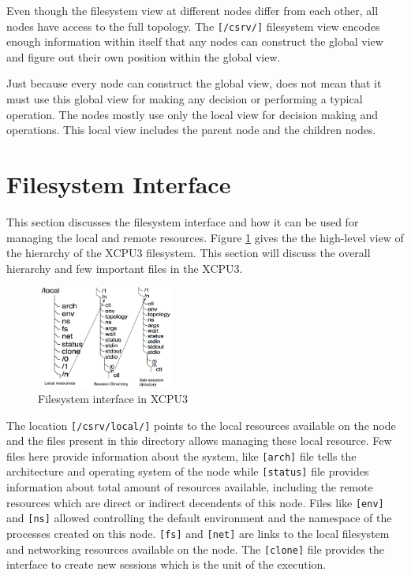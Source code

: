 \documentclass[conference]{IEEEtran}
\begin{document}
Even though the filesystem view at different nodes differ from each other, 
all nodes have access to the full topology.  The \texttt{[/csrv/]} filesystem
view encodes enough information within itself that any nodes can construct the
global view and figure out their own position within the global view.

Just because every node can construct the global view, does not mean that it
must use this global view for making any decision or performing a typical
operation. The nodes mostly use only the local view for decision making and
operations. This local view includes the parent node and the children nodes.


\section{Filesystem Interface}

This section discusses the filesystem interface and how it can be used for
managing the local and remote resources. Figure \ref{fig:xcpu3Local} gives the
the high-level view of the hierarchy of the XCPU3 filesystem.  This section
will discuss the overall hierarchy and few important files in the XCPU3.

\begin{figure}[h]
  \begin{center}
    \leavevmode
      \includegraphics[height=0.25\textheight,width=0.4\textwidth]
		{./img/local_session_subsessions}
    \caption{Filesystem interface in XCPU3}
    \label{fig:xcpu3Local}
  \end{center}
\end{figure}

The location \texttt{[/csrv/local/]} points to the local resources available on
the node and the files present in this directory allows managing these local
resource. Few files here provide information about the system, like
\texttt{[arch]} file tells the architecture and operating system of the node
while \texttt{[status]} file provides information about total amount of
resources available, including the remote resources which are direct or
indirect decendents of this node.  Files like \texttt{[env]} and \texttt{[ns]}
allowed controlling the default environment and the namespace of the processes
created on this node.  \texttt{[fs]} and \texttt{[net]} are links to the local
filesystem and networking resources available on the node.  The
\texttt{[clone]} file provides the interface to create new sessions which is
the unit of the execution.
\end{document}
